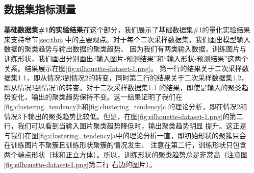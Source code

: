 \documentclass[bachelor, nocolorlinks, printoneside]{seuthesis} %
\begin{document}
\begin{Main}
\subsection{数据集指标测量} 

\textbf{基础数据集\#1的实验结果}在这个部分，我们展示了基础数据集\#1的量化实验结果来支持章节\ref{sec:thm}中的主要观点。对于每个二次采样数据集，我们画出模型输入数据的聚类趋势与输出数据的聚类趋势、
因为我们有两类输入数据，训练图片与训练形状，我们画出分别画出“输入图片-预测结果”和“输入形状-预测结果”这两个关系。结果展示在图\ref{fig:silhouette-dataset-1.png}。
第一行的结果关于二次采样数据集1.1，即从情况3到情况2的转变，同时第二行的结果关于二次采样数据集1.2，即从情况3到情况1的转变。对于二次采样数据集1.1
的结果，即使是输入的聚类趋势变化，输出的聚类趋势保持不变。这一结果证明了我们在\ref{fig:clustering_tendency}b和\ref{fig:clustering_tendency}c
的理论分析，即在情况2和情况3下输出的聚类趋势比较低。但是，在图\ref{fig:silhouette-dataset-1.png}的第二行，我们可以看到当输入图片聚类趋势降低时，输出聚类趋势明显
提升。这正是与我们在图\ref{fig:clustering_tendency}a中的理论分析一直，即初始形状的聚簇只会在训练图片不聚簇且训练形状聚簇的情况发生、
注意在第二行，训练形状只包含两个端点形状（球和正立方体）。所以，训练形状的聚类趋势总是非常高（注意图\ref{fig:silhouette-dataset-1.png}第二行
右边的图片）。


\end{Main}
\end{document}
